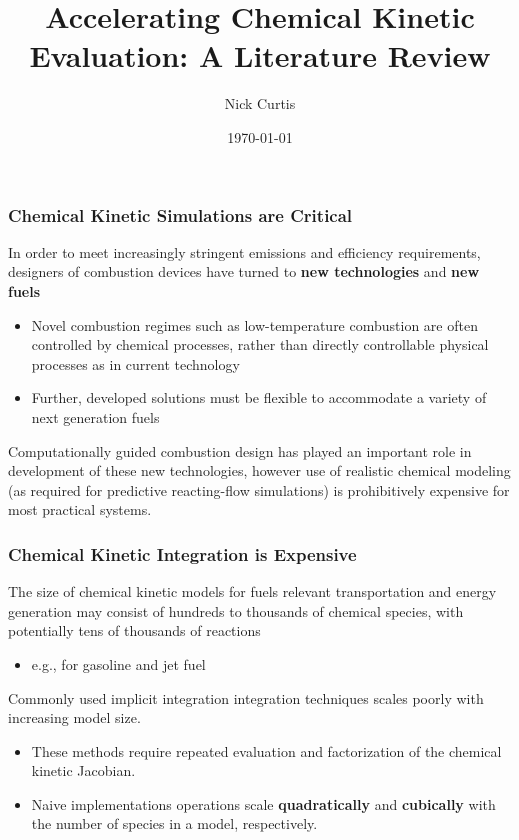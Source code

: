 \documentclass{beamer}
\title{Accelerating Chemical Kinetic Evaluation: A Literature Review}
\author{Nick Curtis}
\institute{University of Connecticut}
\date{\today}
\begin{document}
\maketitle

\begin{frame}
\frametitle{Chemical Kinetic Simulations are \textbf{Critical}}
In order to meet increasingly stringent emissions and efficiency requirements, designers of combustion devices have turned to \textbf{new technologies} and \textbf{new fuels}
\begin{itemize}
 \item Novel combustion regimes such as low-temperature combustion are often controlled by chemical processes, rather than directly controllable physical processes as in current technology
 \item Further, developed solutions must be flexible to accommodate a variety of next generation fuels
\end{itemize}
Computationally guided combustion design has played an important role in development of these new technologies, however use of realistic chemical modeling (as required for predictive reacting-flow simulations) is prohibitively expensive for most practical systems. 
\end{frame}

\begin{frame}
 \frametitle{Chemical Kinetic Integration is \textbf{Expensive}}
 The size of chemical kinetic models for fuels relevant transportation and energy generation may consist of hundreds to thousands of chemical species, with potentially tens of thousands of reactions
 \begin{itemize}
  \item e.g., for gasoline  and jet fuel
 \end{itemize}
 Commonly used implicit integration integration techniques scales poorly with increasing model size.
 \begin{itemize}
  \item These methods require repeated evaluation and factorization of the chemical kinetic Jacobian.
  \item Naive implementations operations scale \textbf{quadratically} and \textbf{cubically} with the number of species in a model, respectively.
 \end{itemize}
\end{frame}
\end{document}

